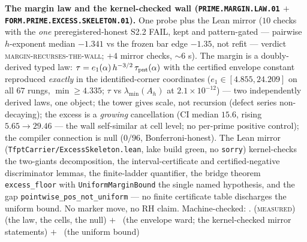\par\smallskip\noindent\textbf{The margin law and the
kernel-checked wall (\texttt{PRIME.MARGIN.LAW.01} $+$
\texttt{FORM.PRIME.\allowbreak EXCESS.\allowbreak SKELETON.01}).}
One probe plus the Lean mirror ($10$ checks with the \emph{one}
preregistered-honest S2.2 FAIL, kept and pattern-gated ---
pairwise $h$-exponent median $-1.341$ vs the frozen bar edge
$-1.35$, not refit --- verdict
\textsc{margin-recurses-the-wall}; $+4$ mirror checks,
$\sim6$ s).  The margin is a doubly-derived typed law:
$\tau = e_1(\alpha)\, h^{-3/2}\, \tau_{\rm pnt}(\alpha)$ with the
certified envelope constant reproduced \emph{exactly} in the
identified-corner coordinates ($e_1 \in [4.855, 24.209]$ on all
$67$ rungs, $\min \ge 4.335$; $\tau$ vs $\lambda_{\min}(A_h)$ at
$2.1\times10^{-12}$) --- two independently derived laws, one
object; the tower gives scale, not recursion (defect series
non-decaying); the excess is a \emph{growing} cancellation (CI
median $15.6$, rising $5.65 \to 29.46$ --- the wall self-similar
at cell level; no per-prime positive control); the compiler
connection is null ($0/96$, Bonferroni-honest).  The Lean mirror
(\texttt{TfptCarrier/ExcessSkeleton.lean}, lake build green, no
\texttt{sorry}) kernel-checks the two-giants decomposition, the
interval-certificate and certified-negative discriminator lemmas,
the finite-ladder quantifier, the bridge theorem
\texttt{excess\_floor} with \texttt{UniformMarginBound} the
single named hypothesis, and the gap
\texttt{pointwise\_pos\_not\_uniform} --- no finite certificate
table discharges the uniform bound.  No marker move, no RH claim.
Machine-checked: .
(\textsc{measured}) (the law, the cells, the null) $+$ \mE\ (the
envelope ward; the kernel-checked mirror statements) $+$ \mO\
(the uniform bound)
\par\smallskip


